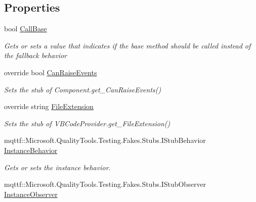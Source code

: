 \subsection*{Properties}
\begin{DoxyCompactItemize}
\item 
bool \hyperlink{class_microsoft_1_1_visual_basic_1_1_fakes_1_1_stub_v_b_code_provider_a251223f37d77b0de8c6013cf45fceac9}{Call\-Base}
\begin{DoxyCompactList}\small\item\em Gets or sets a value that indicates if the base method should be called instead of the fallback behavior\end{DoxyCompactList}\item 
override bool \hyperlink{class_microsoft_1_1_visual_basic_1_1_fakes_1_1_stub_v_b_code_provider_a3a433f6b67e1ac13e0dfae7a4ad71f5e}{Can\-Raise\-Events}
\begin{DoxyCompactList}\small\item\em Sets the stub of Component.\-get\-\_\-\-Can\-Raise\-Events()\end{DoxyCompactList}\item 
override string \hyperlink{class_microsoft_1_1_visual_basic_1_1_fakes_1_1_stub_v_b_code_provider_a2c05862f9c7ca25ee9d2de2edeb895bc}{File\-Extension}
\begin{DoxyCompactList}\small\item\em Sets the stub of V\-B\-Code\-Provider.\-get\-\_\-\-File\-Extension()\end{DoxyCompactList}\item 
mqttf\-::\-Microsoft.\-Quality\-Tools.\-Testing.\-Fakes.\-Stubs.\-I\-Stub\-Behavior \hyperlink{class_microsoft_1_1_visual_basic_1_1_fakes_1_1_stub_v_b_code_provider_ace79ea1790dee743c9803210aa43a1ec}{Instance\-Behavior}
\begin{DoxyCompactList}\small\item\em Gets or sets the instance behavior.\end{DoxyCompactList}\item 
mqttf\-::\-Microsoft.\-Quality\-Tools.\-Testing.\-Fakes.\-Stubs.\-I\-Stub\-Observer \hyperlink{class_microsoft_1_1_visual_basic_1_1_fakes_1_1_stub_v_b_code_provider_a46d5cfd9d5b313f3ba1c9324069fadd3}{Instance\-Observer}

\end{DoxyCompactItemize}
